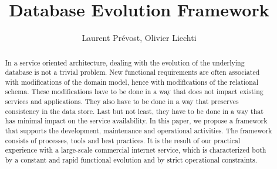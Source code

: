 \documentclass[times]{smrauth}
\begin{document}

\title{Database Evolution Framework}

\author{Laurent Prévost, Olivier Liechti}
\address{
University of Applied Sciences of Western Switzerland, 1400 Yverdon-les-Bains, Switzerland\break
{}Lotaris SA, Galilée 15, 1400 Yverdon-les-Bains, Switzerland}



\begin{abstract}

In a service oriented architecture, dealing with the evolution of the underlying database is not a trivial problem. New functional requirements are often associated with modifications of the domain model, hence with modifications of the relational schema. These modifications have to be done in a way that does not impact existing services and applications. They also have to be done in a way that preserves consistency in the data store. Last but not least, they have to be done in a way that has minimal impact on the service availability. In this paper, we propose a framework that supports the development, maintenance and operational activities. The framework consists of processes, tools and best practices. It is the result of our practical experience with a large-scale commercial internet service, which is characterized both by a constant and rapid functional evolution and by strict operational constraints. 

\end{abstract}


\keywords{}

\maketitle


\renewcommand{\thefootnote}{\arabic{footnote}}











\end{document}
